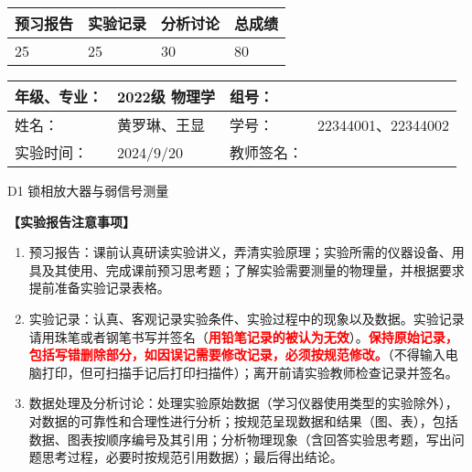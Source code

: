 \documentclass[dvipsnames, svgnames,a4paper,11pt]{article}
\begin{document}
	
	\begin{table}
		\renewcommand\arraystretch{1.7}
		\begin{tabularx}{\textwidth}{
				|X|X|X|X
				|X|X|X|X|}
			\hline
			\multicolumn{2}{|c|}{预习报告}&\multicolumn{2}{|c|}{实验记录}&\multicolumn{2}{|c|}{分析讨论}&\multicolumn{2}{|c|}{总成绩}\\
			\hline
			\LARGE25 & & \LARGE25 & & \LARGE30 & & \LARGE80 & \\
			\hline
		\end{tabularx}
	\end{table}
	
	\begin{table}
		\renewcommand\arraystretch{1.7}
		\begin{tabularx}{\textwidth}{|X|X|X|X|}
			\hline
			年级、专业： & 2022级 物理学 &组号： & \\
			\hline
			姓名： & 黄罗琳、王显   & 学号： &  22344001、22344002 \\
			\hline
			实验时间： & 2024/9/20 & 教师签名： & \\
			\hline
		\end{tabularx}
	\end{table}
	
	\begin{center}
		\LARGE D1 \quad 锁相放大器与弱信号测量
	\end{center}
	
	
	\textbf{【实验报告注意事项】}
	
		\begin{enumerate}
			\item 预习报告：课前认真研读实验讲义，弄清实验原理；实验所需的仪器设备、用具及其使用、完成课前预习思考题；了解实验需要测量的物理量，并根据要求提前准备实验记录表格。
			\item 实验记录：认真、客观记录实验条件、实验过程中的现象以及数据。实验记录请用珠笔或者钢笔书写并签名（\textcolor{red}{\textbf{用铅笔记录的被认为无效}}）。\textcolor{red}{\textbf{保持原始记录，包括写错删除部分，如因误记需要修改记录，必须按规范修改。}}（不得输入电脑打印，但可扫描手记后打印扫描件）；离开前请实验教师检查记录并签名。
			\item 数据处理及分析讨论：处理实验原始数据（学习仪器使用类型的实验除外），对数据的可靠性和合理性进行分析；按规范呈现数据和结果（图、表），包括数据、图表按顺序编号及其引用；分析物理现象（含回答实验思考题，写出问题思考过程，必要时按规范引用数据）；最后得出结论。
		\end{enumerate}
		
\end{document}
